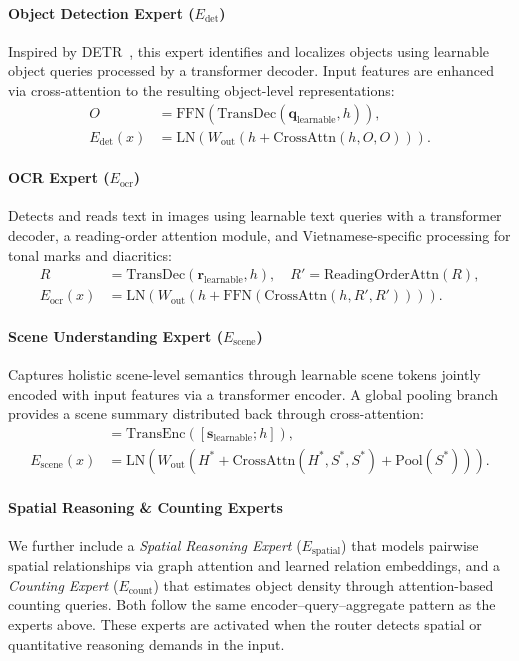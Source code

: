 \paragraph{Object Detection Expert ($E_{\text{det}}$)}
Inspired by DETR~\cite{carion2020end}, this expert identifies and localizes objects using learnable object queries processed by a transformer decoder. Input features are enhanced via cross-attention to the resulting object-level representations:
\begin{align}
    O &= \text{FFN}\!\left(\text{TransDec}(\mathbf{q}_{\text{learnable}}, h)\right), \\
    E_{\text{det}}(x) &= \text{LN}\!\left(W_{\text{out}}\!\left(h + \text{CrossAttn}(h, O, O)\right)\right).
\end{align}

\paragraph{OCR Expert ($E_{\text{ocr}}$)}
Detects and reads text in images using learnable text queries with a transformer decoder, a reading-order attention module, and Vietnamese-specific processing for tonal marks and diacritics:
\begin{align}
    R &= \text{TransDec}(\mathbf{r}_{\text{learnable}}, h), \quad R' = \text{ReadingOrderAttn}(R), \\
    E_{\text{ocr}}(x) &= \text{LN}\!\left(W_{\text{out}}\!\left(h + \text{FFN}(\text{CrossAttn}(h, R', R'))\right)\right).
\end{align}

\paragraph{Scene Understanding Expert ($E_{\text{scene}}$)}
Captures holistic scene-level semantics through learnable scene tokens jointly encoded with input features via a transformer encoder. A global pooling branch provides a scene summary distributed back through cross-attention:
\begin{align}
    [S^*; H^*] &= \text{TransEnc}([\mathbf{s}_{\text{learnable}}; h]), \\
    E_{\text{scene}}(x) &= \text{LN}\!\left(W_{\text{out}}\!\left(H^* + \text{CrossAttn}(H^*, S^*, S^*) + \text{Pool}(S^*)\right)\right).
\end{align}

\paragraph{Spatial Reasoning \& Counting Experts}
We further include a \textit{Spatial Reasoning Expert} ($E_{\text{spatial}}$) that models pairwise spatial relationships via graph attention and learned relation embeddings, and a \textit{Counting Expert} ($E_{\text{count}}$) that estimates object density through attention-based counting queries. Both follow the same encoder--query--aggregate pattern as the experts above. These experts are activated when the router detects spatial or quantitative reasoning demands in the input.

